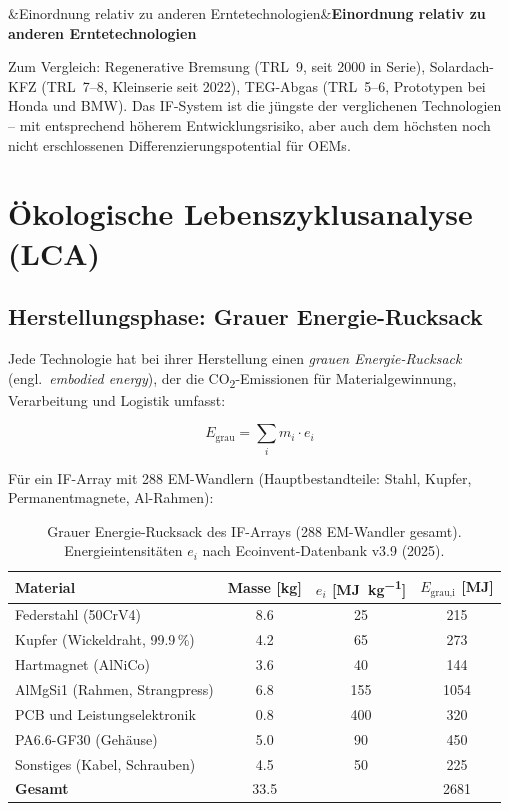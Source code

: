 ﻿\documentclass[12pt, a4paper]{report}
\newenvironment{hinweis}[1][]{%
  \begin{hinweisframe}\sloppy%
  \ifx&#1&\else\textbf{#1}\par\smallskip\fi}{\end{hinweisframe}}
\theoremstyle{definition}
\theoremstyle{remark}
\begin{document}
\begin{hinweis}[Einordnung relativ zu anderen Erntetechnologien]
  Zum Vergleich: Regenerative Bremsung (TRL~9, seit 2000 in Serie),
  Solardach-KFZ (TRL~7--8, Kleinserie seit 2022), TEG-Abgas
  (TRL~5--6, Prototypen bei Honda und BMW). Das IF-System ist die
  jüngste der verglichenen Technologien -- mit entsprechend höherem
  Entwicklungsrisiko, aber auch dem höchsten noch nicht erschlossenen
  Differenzierungspotential für OEMs.
\end{hinweis}

\section{Ökologische Lebenszyklusanalyse (LCA)}
\label{sec:lca}

\subsection{Herstellungsphase: Grauer Energie-Rucksack}

Jede Technologie hat bei ihrer Herstellung einen \emph{grauen Energie-Rucksack}
(engl.\ \emph{embodied energy}), der die CO\textsubscript{2}-Emissionen für
Materialgewinnung, Verarbeitung und Logistik umfasst:

\begin{equation}
  E_{\text{grau}} = \sum_{i} m_i \cdot e_i
  \label{eq:e_grau}
\end{equation}

Für ein IF-Array mit 288 EM-Wandlern (Hauptbestandteile: Stahl, Kupfer,
Permanentmagnete, Al-Rahmen):

\begin{table}[H]
  \centering
  \caption{Grauer Energie-Rucksack des IF-Arrays (288 EM-Wandler gesamt).
           Energieintensitäten $e_i$ nach Ecoinvent-Datenbank v3.9 (2025).}
  \label{tab:grau_energie}
  \begin{tabular}{lSSS}
    \toprule
    Material & {Masse [kg]} & {$e_i$ [\si{\mega\joule\per\kilo\gram}]}
             & {$E_{\text{grau,i}}$ [\si{\mega\joule}]} \\
    \midrule
    Federstahl (50CrV4)           &  8.6 &  25 &  215 \\
    Kupfer (Wickeldraht, 99.9\,\%) &  4.2 &  65 &  273 \\
    Hartmagnet (AlNiCo)           &  3.6 &  40 &  144 \\
    AlMgSi1 (Rahmen, Strangpress) &  6.8 & 155 & 1054 \\
    PCB und Leistungselektronik   &  0.8 & 400 &  320 \\
    PA6.6-GF30 (Gehäuse)          &  5.0 &  90 &  450 \\
    Sonstiges (Kabel, Schrauben)  &  4.5 &  50 &  225 \\
    \midrule
    \textbf{Gesamt}               & 33.5 &     & 2681 \\
    \bottomrule
  \end{tabular}
\end{table}
\end{document}
